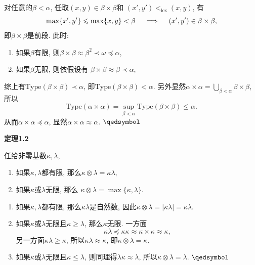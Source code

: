 \documentclass[UTF8]{ctexart}
\begin{document}
对任意的$\beta<\alpha$, 任取$(x,y)\in\beta\times\beta$和
$(x',y')<_{\mathrm{lex}}(x,y)$, 有
\vspace{3pt}
\[
    \max\{x',y'\}\leqslant\max\{x,y\}<\beta
    \quad\implies\quad(x',y')\in\beta\times\beta,\\[3pt]
\]
即$\beta\times\beta$是前段. 此时:
\begin{enumerate}
    \item 如果$\beta$有限,
    则$\beta\times\beta\approx\beta^2\prec\omega\preccurlyeq\alpha$,
    \item 如果$\beta$无限, 则依假设有
    $\beta\times\beta\approx\beta\prec\alpha$,
\end{enumerate}
综上有$\mathrm{Type}(\beta\times\beta)\prec\alpha$,
即$\mathrm{Type}(\beta\times\beta)<\alpha$.
另外显然$\displaystyle\alpha\times\alpha=
\bigcup_{\beta<\alpha}\beta\times\beta$, 所以
\vspace{3pt}
\[
    \mathrm{Type}(\alpha\times\alpha)=
    \sup_{\beta<\alpha}\mathrm{Type}(\beta\times\beta)\leqslant\alpha.
\]
从而$\alpha\times\alpha\preccurlyeq\alpha$,
显然$\alpha\times\alpha\approx\alpha$. \hfill $\qedsymbol$





\newpage

\hypertarget{sec:定理1.2}{}
\noindent\textbf{定理1.2}

任给非零基数$\kappa,\lambda$,
\begin{enumerate}
    \item 如果$\kappa,\lambda$都有限, 那么$\kappa\otimes\lambda=\kappa\lambda$,
    \item 如果$\kappa$或$\lambda$无限, 那么
    $\kappa\otimes\lambda=\max\{\kappa,\lambda\}$.
\end{enumerate}


\begin{enumerate}
    \item 如果$\kappa,\lambda$都有限, 那么$\kappa\lambda$是自然数,
    因此$\kappa\otimes\lambda=|\kappa\lambda|=\kappa\lambda$.
    \item 如果$\kappa$或$\lambda$无限且$\kappa\geqslant\lambda$,
    那么$\kappa$无限. 一方面
    \[
        \kappa\lambda\preccurlyeq\kappa\kappa\approx
        \kappa\times\kappa\approx\kappa,
    \]
    另一方面$\kappa\lambda\geqslant\kappa$, 所以$\kappa\lambda\approx\kappa$,
    即$\kappa\otimes\lambda=\kappa$.
    
    \item 如果$\kappa$或$\lambda$无限且$\kappa\leqslant\lambda$,
    则同理得$\lambda\kappa\approx\lambda$, 所以$\kappa\otimes\lambda=\lambda$.
    \hfill $\qedsymbol$
\end{enumerate}
\end{document}
